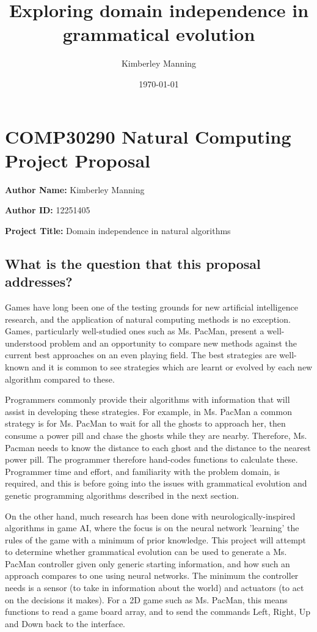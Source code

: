 \documentclass[a4paper,12pt]{article}
\begin{document}
\title{Exploring domain independence in grammatical evolution}
\author{Kimberley Manning}
\date{\today}
\newpage

\section*{COMP30290 Natural Computing Project Proposal}

\textbf{Author Name:} Kimberley Manning

\textbf{Author ID:} 12251405

\textbf{Project Title:} Domain independence in natural algorithms

\subsection*{What is the question that this proposal addresses?}

Games have long been one of the testing grounds for new artificial intelligence research, and the application of natural computing methods is no exception.  Games, particularly well-studied ones such as Ms. PacMan, present a well-understood problem and an opportunity to compare new methods against the current best approaches on an even playing field.  The best strategies are well-known and it is common to see strategies which are learnt or evolved by each new algorithm compared to these.

Programmers commonly provide their algorithms with information that will assist in developing these strategies. For example, in Ms. PacMan a common strategy is for Ms. PacMan to wait for all the ghosts to approach her, then consume a power pill and chase the ghosts while they are nearby. Therefore, Ms. Pacman needs to know the distance to each ghost and the distance to the nearest power pill. The programmer therefore hand-codes functions to calculate these. Programmer time and effort, and familiarity with the problem domain, is required, and this is before going into the issues with grammatical evolution and genetic programming algorithms described in the next section.

On the other hand, much research has been done with neurologically-inspired algorithms in game AI, where the focus is on the neural network 'learning' the rules of the game with a minimum of prior knowledge. This project will attempt to determine whether grammatical evolution can be used to generate a Ms. PacMan controller given only generic starting information, and how such an approach compares to one using neural networks. The minimum the controller needs is a sensor (to take in information about the world) and actuators (to act on the decisions it makes). For a 2D game such as Ms. PacMan, this means functions to read a game board array, and to send the commands Left, Right, Up and Down back to the interface.
\end{document}
